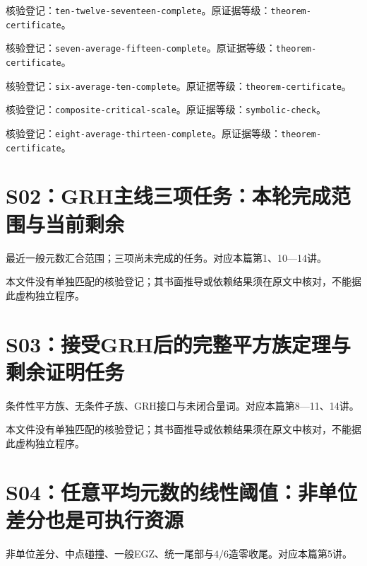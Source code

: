 \documentclass[11pt,a4paper,oneside,openany]{book}
\theoremstyle{definition}\newtheorem{example}[theorem]{例}\newtheorem{conjecture}[theorem]{猜想}
\numberwithin{equation}{chapter}\setcounter{tocdepth}{1}
\begin{document}
核验登记：{\small\nolinkurl{ten-twelve-seventeen-complete}}。原证据等级：{\small\nolinkurl{theorem-certificate}}。

核验登记：{\small\nolinkurl{seven-average-fifteen-complete}}。原证据等级：{\small\nolinkurl{theorem-certificate}}。

核验登记：{\small\nolinkurl{six-average-ten-complete}}。原证据等级：{\small\nolinkurl{theorem-certificate}}。

核验登记：{\small\nolinkurl{composite-critical-scale}}。原证据等级：{\small\nolinkurl{symbolic-check}}。

核验登记：{\small\nolinkurl{eight-average-thirteen-complete}}。原证据等级：{\small\nolinkurl{theorem-certificate}}。

\section{S02：GRH主线三项任务：本轮完成范围与当前剩余}\label{source:S02}

最近一般元数汇合范围；三项尚未完成的任务。对应本篇第1、10—14讲。

\par{}\par

本文件没有单独匹配的核验登记；其书面推导或依赖结果须在原文中核对，不能据此虚构独立程序。

\section{S03：接受GRH后的完整平方族定理与剩余证明任务}\label{source:S03}

条件性平方族、无条件子族、GRH接口与未闭合量词。对应本篇第8—11、14讲。

\par{}\par

本文件没有单独匹配的核验登记；其书面推导或依赖结果须在原文中核对，不能据此虚构独立程序。

\section{S04：任意平均元数的线性阈值：非单位差分也是可执行资源}\label{source:S04}

非单位差分、中点碰撞、一般EGZ、统一尾部与4/6造零收尾。对应本篇第5讲。
\end{document}
